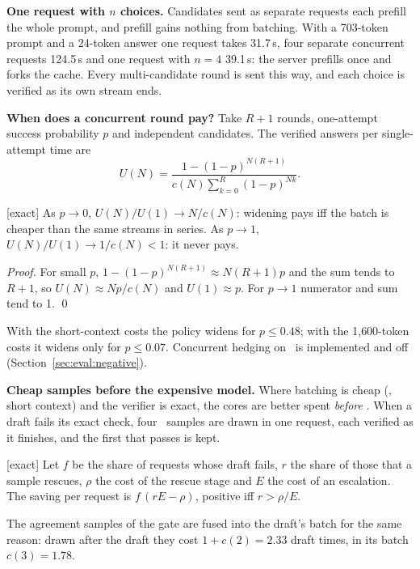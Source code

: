 \textbf{One request with $n$ choices.} Candidates sent as separate requests
each prefill the whole prompt, and prefill gains nothing from batching. With a
703-token prompt and a 24-token answer one request takes 31.7\,s, four
separate concurrent requests 124.5\,s and one request with $n=4$ 39.1\,s: the
server prefills once and forks the cache. Every multi-candidate round is sent
this way, and each choice is verified as its own stream ends.

\textbf{When does a concurrent round pay?} Take $R+1$ rounds, one-attempt
success probability $p$ and independent candidates. The verified answers per
single-attempt time are
\begin{equation}
U(N)=\frac{1-(1-p)^{N(R+1)}}{c(N)\sum_{k=0}^{R}(1-p)^{Nk}} .
\label{eq:util}
\end{equation}
\begin{proposition} \textnormal{[exact]}
\label{prop:wide}
As $p\to0$, $U(N)/U(1)\to N/c(N)$: widening pays iff the batch is cheaper than
the same streams in series. As $p\to1$, $U(N)/U(1)\to 1/c(N)<1$: it never pays.
\end{proposition}
\begin{proof}
For small $p$, $1-(1-p)^{N(R+1)}\approx N(R+1)p$ and the sum tends to $R+1$, so
$U(N)\approx Np/c(N)$ and $U(1)\approx p$. For $p\to1$ numerator and sum tend
to 1. \qed
\end{proof}
With the short-context costs the policy widens for $p\le0.48$; with the
1{,}600-token costs it widens only for $p\le0.07$. Concurrent hedging on
\Stwo\ is implemented and off (Section~\ref{sec:eval:negative}).

\textbf{Cheap samples before the expensive model.} Where batching is cheap
(\Sone, short context) and the verifier is exact, the cores are better spent
\emph{before} \Stwo. When a draft fails its exact check, four \Sone\ samples
are drawn in one request, each verified as it finishes, and the first that
passes is kept.
\begin{proposition} \textnormal{[exact]}
\label{prop:rescue}
Let $f$ be the share of requests whose draft fails, $r$ the share of those
that a sample rescues, $\rho$ the cost of the rescue stage and $E$ the cost of
an escalation. The saving per request is $f\,(rE-\rho)$, positive iff
$r>\rho/E$.
\end{proposition}
The agreement samples of the gate are fused into the draft's batch for the
same reason: drawn after the draft they cost $1+c(2)=2.33$ draft times, in its
batch $c(3)=1.78$.

